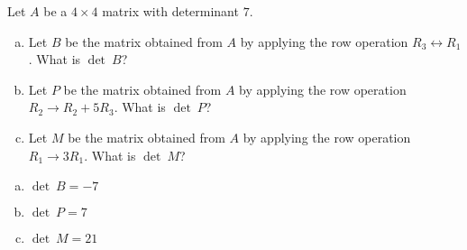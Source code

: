 
\begin{exerciseStatement}


Let \(A\) be a \(4 \times 4\) matrix with determinant \( 7 \).


\begin{enumerate}[(a)]
\item Let \(B\) be the matrix obtained from \(A\) by applying the row operation \( R_3 \leftrightarrow R_1 \). What is \(\operatorname{det}\ B\)?
\item Let \(P\) be the matrix obtained from \(A\) by applying the row operation \( R_2 \to R_2 + 5R_3 \). What is \(\operatorname{det}\ P\)?
\item Let \(M\) be the matrix obtained from \(A\) by applying the row operation \( R_1 \to 3R_1 \). What is \(\operatorname{det}\ M\)?
\end{enumerate}
    
\end{exerciseStatement}
    
\begin{exerciseAnswer} 

\begin{enumerate}[(a)]
\item \(\operatorname{det}\ B= -7 \)
\item \(\operatorname{det}\ P= 7 \)
\item \(\operatorname{det}\ M= 21 \)
\end{enumerate}
    
\end{exerciseAnswer}
    
